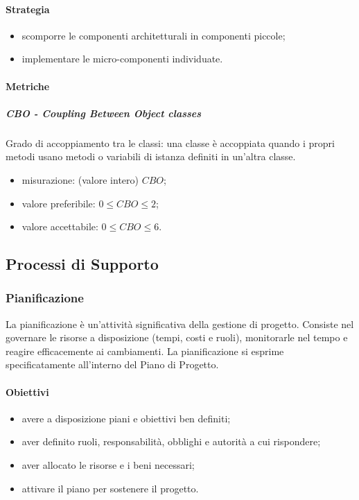 		\paragraph{Strategia}
		\begin{itemize}
			\item scomporre le componenti architetturali in componenti piccole;
			\item implementare le micro-componenti individuate.
		\end{itemize}
		\paragraph{Metriche}
			\subparagraph{CBO - Coupling Between Object classes} 
			Grado di accoppiamento tra le classi: una classe è accoppiata quando i propri metodi usano metodi o variabili di istanza definiti in un'altra classe. 
			\begin{itemize}
				\item misurazione: (valore intero) $CBO$;
				\item valore preferibile: $0 \leq CBO \leq 2$;
				\item valore accettabile: $0 \leq CBO \leq 6$.
			\end{itemize}
		
\subsection{Processi di Supporto}
	\subsubsection{Pianificazione}
	La pianificazione è un'attività significativa della gestione di progetto. Consiste nel governare le risorse a disposizione (tempi, costi e ruoli), monitorarle nel tempo e reagire efficacemente ai cambiamenti. La pianificazione si esprime specificatamente all'interno del Piano di Progetto.
		\paragraph{Obiettivi}
		\begin{itemize}
			\item avere a disposizione piani e obiettivi ben definiti;
			\item aver definito ruoli, responsabilità, obblighi e autorità a cui rispondere;
			\item aver allocato le risorse e i beni necessari;
			\item attivare il piano per sostenere il progetto.
		\end{itemize}	
